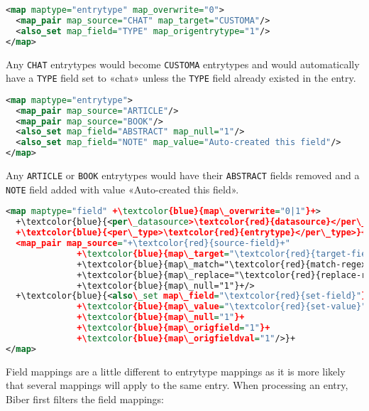 \documentclass{ltxdockit}
\begin{document}
\begin{lstlisting}[language=xml,escapechar=+,mathescape=true]
<map maptype="entrytype" map_overwrite="0">
  <map_pair map_source="CHAT" map_target="CUSTOMA"/>
  <also_set map_field="TYPE" map_origentrytype="1"/>
</map>
\end{lstlisting}

\noindent Any \verb+CHAT+ entrytypes would become \verb+CUSTOMA+ entrytypes and 
would automatically have a \verb+TYPE+ field set to 
«chat» unless the \verb+TYPE+ field already existed in the entry.

\begin{lstlisting}[language=xml,escapechar=+,mathescape=true]
<map maptype="entrytype">
  <map_pair map_source="ARTICLE"/>
  <map_pair map_source="BOOK"/>
  <also_set map_field="ABSTRACT" map_null="1"/>
  <also_set map_field="NOTE" map_value="Auto-created this field"/>
</map>
\end{lstlisting}

\noindent Any \verb+ARTICLE+ or \verb+BOOK+ entrytypes would have their \verb+ABSTRACT+
fields removed and a \verb+NOTE+ field added with value «Auto-created this field».
\bigskip
{}

\begin{lstlisting}[language=xml,escapechar=+,mathescape=true]
<map maptype="field" +\textcolor{blue}{map\_overwrite="0|1"}+>
  +\textcolor{blue}{<per\_datasource>\textcolor{red}{datasource}</per\_datasource>}+
  +\textcolor{blue}{<per\_type>\textcolor{red}{entrytype}</per\_type>}+
  <map_pair map_source="+\textcolor{red}{source-field}+"
              +\textcolor{blue}{map\_target="\textcolor{red}{target-field}"}+/>
              +\textcolor{blue}{map\_match="\textcolor{red}{match-regexp}"}+
              +\textcolor{blue}{map\_replace="\textcolor{red}{replace-regexp}"}+
              +\textcolor{blue}{map\_null="1"}+/>
  +\textcolor{blue}{<also\_set map\_field="\textcolor{red}{set-field}"}+
              +\textcolor{blue}{map\_value="\textcolor{red}{set-value}"}+
              +\textcolor{blue}{map\_null="1"}+
              +\textcolor{blue}{map\_origfield="1"}+
              +\textcolor{blue}{map\_origfieldval="1"/>}+
</map>
\end{lstlisting}

\noindent Field mappings are a little different to entrytype mappings
as it is more likely that several mappings will apply to the same
entry. When processing an entry, Biber first filters the field mappings:\\
\end{document}
